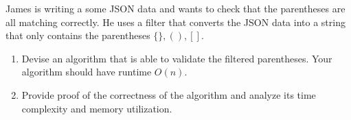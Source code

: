 \documentclass{common/cs157}
\begin{document}
\newpage
\begin{problem}{3}
James is writing a some JSON data and wants to check that the parentheses are all matching correctly. He uses a filter that converts the JSON data into a string that only contains the parentheses $\{\}, (), [ ]$.

\begin{enumerate}
    \item Devise an algorithm that is able to validate the filtered parentheses. Your algorithm should have runtime $O(n)$.
    \item Provide proof of the correctness of the algorithm and analyze its time complexity and memory utilization.
\end{enumerate}
\end{problem}

\newpage
\end{document}
